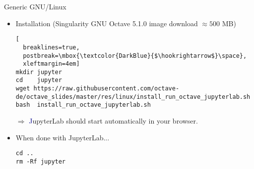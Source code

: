 \begin{frame}[fragile]{Generic GNU/Linux}
\begin{itemize}
\itemsep2em
\item Installation
({\color{DarkBlue}Singularity} GNU Octave 5.1.0 image download $\approx 500$ MB)
\begin{lstlisting}[
  breaklines=true,
  postbreak=\mbox{\textcolor{DarkBlue}{$\hookrightarrow$}\space},
  xleftmargin=4em]
mkdir jupyter
cd    jupyter
wget https://raw.githubusercontent.com/octave-de/octave_slides/master/res/linux/install_run_octave_jupyterlab.sh
bash  install_run_octave_jupyterlab.sh
\end{lstlisting}
$\Rightarrow$ {\textcolor{DarkBlue}JupyterLab} should start automatically
in your browser.

\item When done with JupyterLab...
\begin{lstlisting}[xleftmargin=4em]
cd ..
rm -Rf jupyter
\end{lstlisting}
\end{itemize}
\end{frame}
